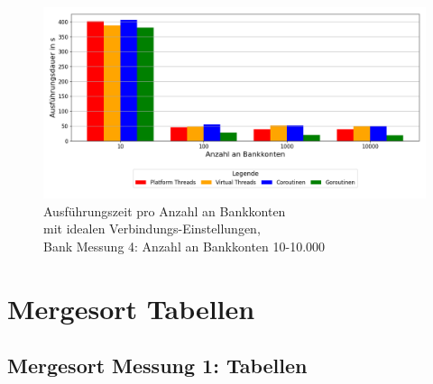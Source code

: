 \documentclass[fontsize=12pt,paper=a4,twoside=semi,parskip=half-,headsepline,headinclude]{scrreprt}
\begin{document}
\begin{figure}[H]
	\centering
	\includegraphics[scale=0.5]{figures/bank/accountsIdeal/execution_time_plot.png}
	\caption{Ausführungszeit pro Anzahl an Bankkonten \\mit idealen Verbindungs-Einstellungen, \\Bank Messung 4: Anzahl an Bankkonten 10-10.000}
	\label{fig:bankAccountsIdealZeit}
\end{figure}

\section{Mergesort Tabellen}

\subsection{Mergesort Messung 1: Tabellen}
\end{document}
